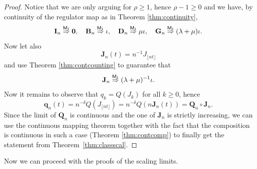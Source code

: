 \documentclass[]{amsart}
\numberwithin{equation}{section}
\theoremstyle{remark}
\theoremstyle{definition}
\begin{document}
\begin{proof}
	Notice that we are only arguing for $\rho \ge 1$, hence $\rho-1 \ge 0$ and we have, by continuity of the regulator map as in Theorem \ref{thm:continuity},
	\begin{equation*}
		\mathbf{I}_n \overset{\sf M_1}{\Rightarrow} \mathbf{0}, \quad \mathbf{B}_n \overset{\sf M_1}{\Rightarrow} \iota, \quad \mathbf{D}_n \overset{\sf M_1}{\Rightarrow} \mu\iota, \quad 
		\mathbf{G}_n \overset{\sf M_1}{\Rightarrow} (\lambda+\mu) \iota.
	\end{equation*}
	Now let also
	\begin{equation*}
		\mathbf{J}_n(t)=n^{-1}J_{\lfloor nt \rfloor}
	\end{equation*}
	and use Theorem \ref{thm:contcounting} to guarantee that
	\begin{equation*}
		\mathbf{J}_n \overset{\sf M_1}{\Rightarrow} (\lambda+\mu)^{-1}\iota.
	\end{equation*}
	Now it remains to observe that $q_k=Q(J_k)$ for all $k \ge 0$, hence
	\begin{equation*}
		\mathbf{q}_n(t)=n^{-\delta}Q(J_{\lfloor nt \rfloor})=n^{-\delta}Q(n\mathbf{J}_n(t))=\mathbf{Q}_n \circ \mathbf{J}_n.
	\end{equation*}
	Since the limit of $\mathbf{Q}_n$ is continuous and the one of $\mathbf{J}_n$ is strictly increasing, we can use the continuous mapping theorem together with the fact that the composition is continuous in such a case (Theorem \ref{thm:contcomp}) to finally get the statement from Theorem~\ref{thm:classscal}.
\end{proof}
Now we can proceed with the proofs of the scaling limits.

\end{document}
